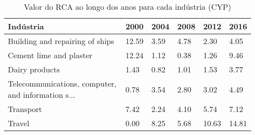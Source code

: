 \begin{table}
\centering
\caption{Valor do RCA ao longo dos anos para cada indústria (CYP)}
\label{tab:ex3-tempo-CYP}
\begin{tabular}{p{6cm}p{1.5cm}p{1.5cm}p{1.5cm}p{1.5cm}p{1.5cm}}
\toprule
                                         Indústria &  2000 & 2004 & 2008 &  2012 &  2016 \\
\midrule
                   Building and repairing of ships & 12.59 & 3.59 & 4.78 &  2.30 &  4.05 \\
                           Cement lime and plaster & 12.24 & 1.12 & 0.38 &  1.26 &  9.46 \\
                                    Dairy products &  1.43 & 0.82 & 1.01 &  1.53 &  3.77 \\
Telecommunications, computer, and information s... &  0.78 & 3.54 & 2.80 &  3.02 &  4.49 \\
                                         Transport &  7.42 & 2.24 & 4.10 &  5.74 &  7.12 \\
                                            Travel &  0.00 & 8.25 & 5.68 & 10.63 & 14.81 \\
\bottomrule
\end{tabular}
\end{table}
